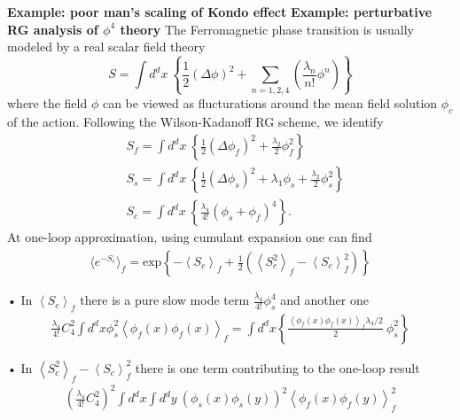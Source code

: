 \documentclass[submission, PhysLectNotes]{SciPost}
\newcommand{\ExOp}[1]{\left\langle#1\right\rangle}
\begin{document}
{\bf Example: poor man's scaling of Kondo effect}
{\bf Example: perturbative RG analysis of $\phi^4$ theory}
The Ferromagnetic phase transition is usually modeled by a real scalar field theory
\begin{equation}
S = \int d^dx \ \left\{\frac{1}{2}\left(\Delta\phi\right)^2 + \sum_{n=1,2,4}\left(\frac{\lambda_n}{n!}\phi^n\right) \right\}
\end{equation}
where the field $\phi$ can be viewed as flucturations around the mean field solution $\phi_c$ of the action. Following the Wilson-Kadanoff RG scheme, we identify
\begin{equation}
\begin{aligned}
&S_f = \int d^dx \ \left\{\frac{1}{2}\left(\Delta\phi_f\right)^2 + \frac{\lambda_2}{2}\phi_f^2 \right\} \\
&S_s = \int d^dx \ \left\{\frac{1}{2}\left(\Delta\phi_s\right)^2 + \lambda_1 \phi_s + \frac{\lambda_2}{2}\phi_s^2 \right\} \\
&S_c = \int d^dx \ \left\{ \frac{\lambda_4}{4!}\left(\phi_s + \phi_f\right)^4 \right\}.
\end{aligned}
\end{equation}
At one-loop approximation, using cumulant expansion one can find
\begin{equation}
\begin{aligned}
\langle e^{-S_c} \rangle_f = \mathrm{exp}\left\{{-\ExOp{S_c}_f + \frac{1}{2}\left( \ExOp{S_c^2}_f - \ExOp{S_c}_f^2\right)}\right\}
\end{aligned}
\end{equation}%

• In $\ExOp{S_c}_f$ there is a pure slow mode term $\frac{\lambda_4}{4!}\phi_s^4$ and another one
\begin{equation}
\begin{aligned}
\frac{\lambda_4}{4!} C^2_4 \int d^dx  \phi_s^2 \ExOp{\phi_f(x)\phi_f(x)}_f = \int d^dx \left\{ \frac{\ExOp{\phi_f(x)\phi_f(x)}_f\lambda_4/2}{2}\ \phi_s^2\right\}
\end{aligned}
\end{equation}

• In $\ExOp{S_c^2}_f - \ExOp{S_c}_f^2$ there is one term contributing to the one-loop result
\begin{equation}
\begin{aligned}
\left( \frac{\lambda_4}{4!} C^2_4 \right)^2 \int d^dx \int d^dy \ \left(\phi_s(x)\phi_s(y)\right)^2 \ExOp{\phi_f(x) \phi_f(y)}_f^2
\end{aligned}
\end{equation}
\end{document}
